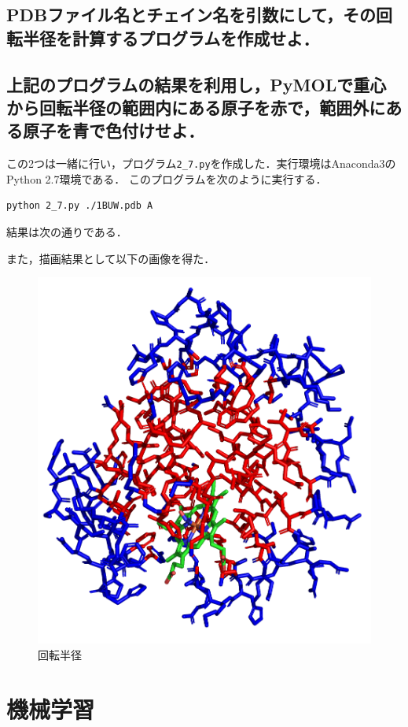 \documentclass[uplatex,a4j]{jsarticle}
\begin{document}
  \subsection{PDBファイル名とチェイン名を引数にして，その回転半径を計算するプログラムを作成せよ．}
  \subsection{上記のプログラムの結果を利用し，PyMOLで重心から回転半径の範囲内にある原子を赤で，範囲外にある原子を青で色付けせよ．}
  この2つは一緒に行い，プログラム{\tt 2\_7.py}を作成した．実行環境はAnaconda3のPython 2.7環境である．
  このプログラムを次のように実行する．
  \begin{lstlisting}[caption=実行方法, label=run6]
    python 2_7.py ./1BUW.pdb A
  \end{lstlisting}
  結果は次の通りである．
  
  また，描画結果として以下の画像を得た．
  \begin{figure}[H]
    \begin{center}
      \includegraphics[width=12cm]{2_8.png}
      \caption{回転半径}
      \label{2_8}
    \end{center}
  \end{figure}
  
  \section{機械学習}
\end{document}
